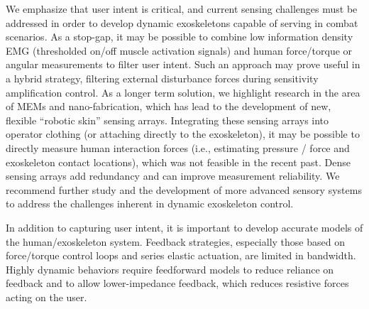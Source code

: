 \documentclass[letterpaper,12pt,fullpage]{article}
\begin{document}
We emphasize that user intent is critical, and current sensing challenges must be addressed in order to develop dynamic exoskeletons capable of serving in combat scenarios.  As a stop-gap, it may be possible to combine low information density EMG (thresholded on/off muscle activation signals) and human force/torque or angular measurements to filter user intent.  Such an approach may prove useful in a hybrid strategy, filtering external disturbance forces during sensitivity amplification control.  As a longer term solution, we highlight research in the area of MEMs and nano-fabrication, which has lead to the development of new, flexible ``robotic skin'' sensing arrays.  Integrating these sensing arrays into operator clothing (or attaching directly to the exoskeleton), it may be possible to directly measure human interaction forces (i.e., estimating pressure / force and exoskeleton contact locations), which was not feasible in the recent past.  Dense sensing arrays add redundancy and can improve measurement reliability. We recommend further study and the development of more advanced sensory systems to address the challenges inherent in dynamic exoskeleton control.

In addition to capturing user intent, it is important to develop accurate models of the human/exoskeleton system.  Feedback strategies, especially those based on force/torque control loops and series elastic actuation, are limited in bandwidth. Highly dynamic behaviors require feedforward models to reduce reliance on feedback and to allow lower-impedance feedback, which reduces resistive forces acting on the user.


\end{document}
